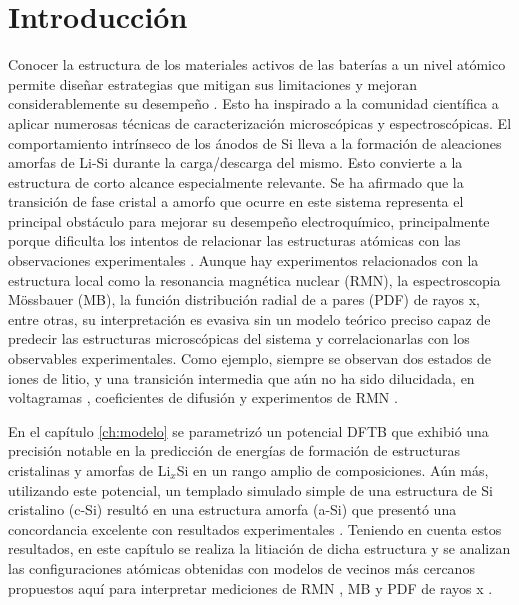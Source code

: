 \section{Introducción}

Conocer la estructura de los materiales activos de las baterías a un nivel atómico permite diseñar
estrategias que mitigan sus
limitaciones y mejoran considerablemente su desempeño \cite{liu2019review}.
Esto ha inspirado a la comunidad científica a aplicar numerosas técnicas 
de caracterización microscópicas y espectroscópicas. El comportamiento 
intrínseco de los ánodos de Si lleva a la formación de aleaciones amorfas de 
Li-Si durante la carga/descarga del mismo. Esto convierte a la estructura
de corto alcance especialmente relevante. Se ha afirmado que la transición de 
fase cristal a amorfo que ocurre en este sistema representa el principal 
obstáculo para mejorar su desempeño electroquímico, principalmente porque 
dificulta los intentos de relacionar las estructuras atómicas con las 
observaciones experimentales \cite{key2011}. Aunque hay experimentos 
relacionados con la estructura local como la resonancia magnética nuclear (RMN),
la espectroscopia Mössbauer (MB), la función distribución radial de a pares 
(PDF) de rayos x, entre otras, su interpretación es evasiva sin un modelo 
teórico preciso capaz de predecir las estructuras microscópicas del sistema
y correlacionarlas con los observables experimentales. Como ejemplo, siempre 
se observan dos estados de iones de litio, y una transición intermedia que aún 
no ha sido dilucidada, en voltagramas \cite{pan2019}, coeficientes de 
difusión \cite{ding2009} y experimentos de RMN \cite{key2009}.

En el capítulo \ref{ch:modelo} se parametrizó un potencial DFTB que exhibió 
una precisión notable en la predicción de energías de formación de 
estructuras cristalinas y amorfas de Li$_x$Si en un rango amplio de 
composiciones. Aún más, utilizando este potencial, un templado simulado simple
de una estructura de Si cristalino (c-Si) resultó en una estructura amorfa 
(a-Si) que presentó una concordancia excelente con resultados experimentales
\cite{laaziri1999}. Teniendo en cuenta estos resultados, en este capítulo se realiza
la litiación de dicha estructura y se analizan las configuraciones atómicas obtenidas 
con modelos de vecinos más cercanos propuestos aquí para 
interpretar mediciones de RMN \cite{ogata2014, key2011, koster2011, key2009}, 
MB \cite{li2009} y PDF de rayos x \cite{key2011, laaziri1999}.
